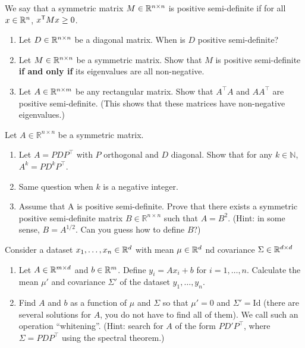 \documentclass[11pt,nocut]{article}
\begin{document}


\begin{problem}[3 points]
	We say that a symmetric matrix $M \in \mathbb{R}^{n \times n}$ is positive semi-definite if for all $x \in \mathbb{R}^n$, $
	x^{{\sf T}} M x \geq 0$.
	\begin{enumerate}[label=\normalfont(\textbf{\alph*})]
  \item Let $D \in \mathbb{R}^{n \times n}$ be a diagonal matrix. When is $D$ positive semi-definite?
  \item Let $M \in \mathbb{R}^{n \times n}$ be a symmetric matrix. Show that $M$ is positive semi-definite \textbf{if and only if} its eigenvalues are all non-negative.
  \item Let $A \in \mathbb{R}^{n \times m}$ be any rectangular matrix. Show that $A^\top A$ and $AA^\top$ are positive semi-definite. (This shows that these matrices have non-negative eigenvalues.)
	\end{enumerate}
\end{problem}

\vspace{5mm}

\begin{problem}[3 points]
	Let $A \in \mathbb{R}^{n \times n}$ be a symmetric matrix.
    \begin{enumerate}[label=\normalfont(\textbf{\alph*})]
    \item Let $A = PDP^\top$ with $P$ orthogonal and $D$ diagonal. Show that for any $k \in \mathbb N$, $A^k = P D^k P^\top$.
    \item Same question when $k$ is a negative integer.
    \item Assume that A is positive semi-definite. Prove that there exists a symmetric positive semi-definite matrix $B \in \mathbb{R}^{n \times n}$ such that $A = B^2$. (Hint: in some sense, $B = A^{1/2}$. Can you guess how to define $B$?)
    \end{enumerate}
\end{problem}

\vspace{5mm}

\begin{problem}[2 points]
  Consider a dataset $x_1, \dots, x_n \in \mathbb{R}^d$ with mean $\mu \in \mathbb{R}^d$ nd covariance $\Sigma \in \mathbb{R}^{d \times d}$
	\begin{enumerate}[label=\normalfont(\textbf{\alph*})]
  \item Let $A \in \mathbb{R}^{m \times d}$ and $b \in \mathbb{R}^m$. Define $y_i = Ax_i + b$ for $i = 1,\dots, n$. Calculate the mean $\mu'$ and covariance $\Sigma'$ of the dataset $y_1, \dots, y_n$.
  \item Find $A$ and $b$ as a function of $\mu$ and $\Sigma$ so that $\mu' = 0$ and $\Sigma' = \mathrm{Id}$ (there are several solutions for $A$, you do not have to find all of them). We call such an operation ``whitening''. (Hint: search for $A$ of the form $PD'P^\top$, where $\Sigma = PDP^\top$ using the spectral theorem.)
  \end{enumerate}
\end{problem}
\end{document}
